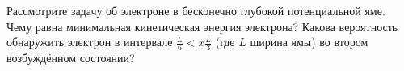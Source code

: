 \documentclass[__main__.tex]{subfiles}
\begin{document}
Рассмотрите задачу об электроне в бесконечно глубокой потенциальной яме. Чему равна минимальная кинетическая энергия электрона? Какова вероятность обнаружить электрон в интервале $\frac{L}{6}<x\frac{L}{3}$ (где $L$ ширина ямы) во втором возбуждённом состоянии?\\ 

\end{document}
